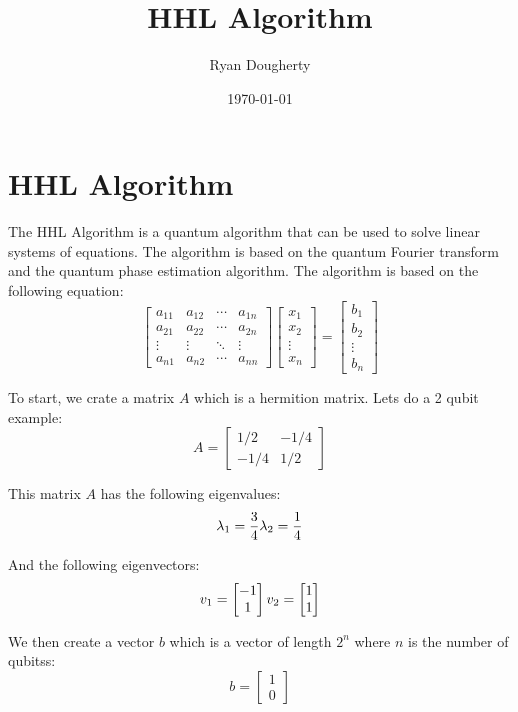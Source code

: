 \documentclass[12pt]{article}
\title{HHL Algorithm}
\author{Ryan Dougherty}
\date{\today}
\begin{document}
\maketitle

\section*{HHL Algorithm}
The HHL Algorithm is a quantum algorithm that can be used to solve linear systems of equations. 
The algorithm is based on the quantum Fourier transform and the quantum phase estimation algorithm. The algorithm is based on the following equation:
\[
\begin{bmatrix}
a_{11} & a_{12} & \cdots & a_{1n}\\
a_{21} & a_{22} & \cdots & a_{2n}\\
\vdots & \vdots & \ddots & \vdots\\
a_{n1} & a_{n2} & \cdots & a_{nn}
\end{bmatrix}
\begin{bmatrix}
x_1\\
x_2\\
\vdots\\
x_n
\end{bmatrix}
=
\begin{bmatrix}
b_1\\
b_2\\
\vdots\\
b_n
\end{bmatrix}
\]

To start, we crate a matrix $A$ which is a hermition matrix. Lets do a 2 qubit example:
\[
A = \begin{bmatrix}
 1/2 & -1/4\\
-1/4 &  1/2
\end{bmatrix}
\]

This matrix $A$ has the following eigenvalues:
\[
\lambda_1 = \frac{3}{4}\\
\lambda_2 = \frac{1}{4}
\]

And the following eigenvectors:
\[
v_1 = \begin{bmatrix}
-1\\
1
\end{bmatrix}\\
v_2 = \begin{bmatrix}
1\\
1
\end{bmatrix}
\]

We then create a vector $b$ which is a vector of length $2^n$ where $n$ is the number of qubitss:
\[
b = \begin{bmatrix}
1\\
0
\end{bmatrix}
\]
\end{document}
